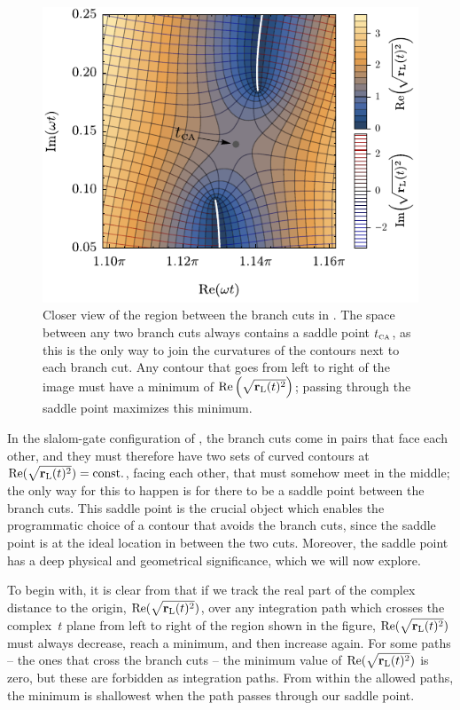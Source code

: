 \begin{figure}[htb]
  \centering
  \includegraphics[scale=1]{5-Quantum-orbits/Figures/figure5F.pdf}
  \caption[
  Closer view of the `slalom gate' between two paired Coulomb branch cuts
  ]{
  Closer view of the region between the branch cuts in . The space between any two branch cuts always contains a saddle point ${t_{\scriptscriptstyle\mathrm{CA}}}$, as this is the only way to join the curvatures of the contours next to each branch cut. Any contour that goes from left to right of the image must have a minimum of $\Re\left(\sqrt{\vb{r}_\mathrm{L}(t)^2}\right)$; passing through the saddle point maximizes this minimum.
  }
  \label{f5-tCA-zoom}
\end{figure}

In the slalom-gate configuration of , the branch cuts come in pairs that face each other, and they must therefore have two sets of curved  contours at $\Re(\sqrt{\vb{r}_\mathrm{L}(t)^2})=\mathrm{const.}$, facing each other, that must somehow meet in the middle; the only way for this to happen is for there to be a saddle point between the branch cuts. This saddle point is the crucial object which enables the programmatic choice of a contour that avoids the branch cuts, since the saddle point is at the ideal location in between the two cuts. Moreover, the saddle point has a deep physical and geometrical significance, which we will now explore.

To begin with, it is clear from  that if we track the real part of the complex distance to the origin, $\Re(\sqrt{\vb{r}_\mathrm{L}(t)^2})$, over any integration path which crosses the complex~$t$ plane from left to right of the region shown in the figure, $\Re(\sqrt{\vb{r}_\mathrm{L}(t)^2})$ must always decrease, reach a minimum, and then increase again. For some paths -- the ones that cross the branch cuts -- the minimum value of $\Re(\sqrt{\vb{r}_\mathrm{L}(t)^2})$ is zero, but these are forbidden as integration paths. From within the allowed paths, the minimum is shallowest when the path passes through our saddle point.

